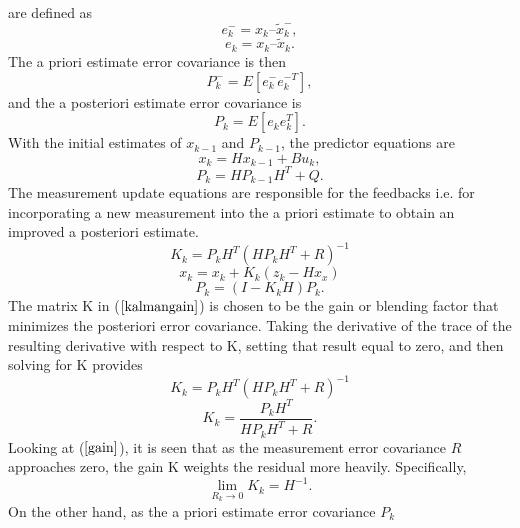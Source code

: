 \documentclass[journal]{IEEEtran}
\begin{document}
are defined as
\begin{equation}
e_k^- = x_k – \tilde x_k^- ,
\end{equation}
\begin{equation}
e_k =  x_k – \tilde x_k.
\end{equation}
The a priori estimate error covariance is then
\begin{equation}
P_k^- = E[ e_k^- e_k^{-T} ],
\end{equation}
and the a posteriori estimate error covariance is
\begin{equation}
P_k = E[e_k e_k^T].
\end{equation}
With the initial estimates of $x_{k-1}$ and $P_{k-1}$, the predictor equations are
\begin{equation}
x_k = Hx_{k-1} + Bu_k,
\end{equation}
\begin{equation}
P_k = HP_{k-1}H^T + Q.
\end{equation}
The measurement update equations are responsible for the feedbacks
i.e. for incorporating a new measurement into the a priori estimate
to obtain an improved a posteriori estimate.
\begin{equation}
K_k = P_kH^T(HP_kH^T + R)^{-1} \label{kalmangain}
\end{equation}
\begin{equation}
x_k = x_k + K_k(z_k - Hx_x)
\end{equation}
\begin{equation}
P_k = (I-K_kH)P_k.
\end{equation}
The matrix K in ($\ref{kalmangain}$) is
chosen to be the gain or blending factor that minimizes the
posteriori error covariance. Taking the derivative of the trace of
the resulting derivative with respect to K, setting that result equal to zero, and
then solving for K provides
\begin{equation}
K_k = P_kH^{T}(HP_kH^{T} + R)^{-1}
\end{equation}
\begin{equation}
K_k = \dfrac{P_kH^T}{HP_kH^T + R}. \label{gain}
\end{equation}
Looking at ($\ref{gain}$), it is seen that as the measurement error
covariance $R$ approaches zero, the gain K weights the residual more
heavily. Specifically,
\begin{equation}
\mathop {\lim }\limits_{R_k \to 0 } {K_k} = H^{-1}.
\end{equation}
On the other hand, as the a priori estimate error covariance $P_k$
\end{document}
